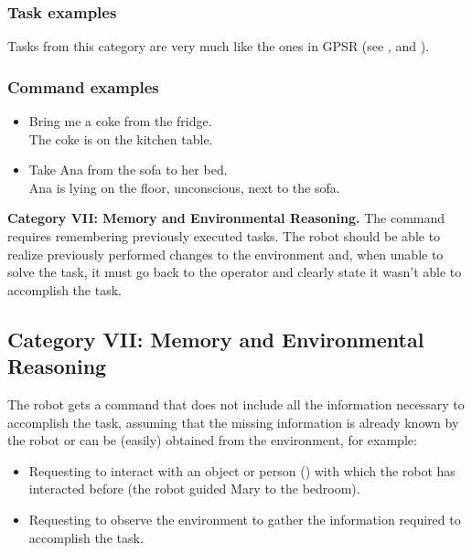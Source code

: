 \subsubsection{Task examples}
Tasks from this category are very much like the ones in GPSR (see ,  and ).

\subsubsection{Command examples}
\begin{itemize}
	\item Bring me a coke from the fridge. \\
	The coke is on the kitchen table. \\

	\item Take Ana from the sofa to her bed. \\
	Ana is lying on the floor, unconscious, next to the sofa. \\
\end{itemize}

		\item \textbf{Category VII: Memory and Environmental Reasoning.} The command requires remembering previously executed tasks. The robot should be able to realize previously performed changes to the environment and, when unable to solve the task, it must go back to the operator and clearly state  it wasn't able to accomplish the task.


%
%
\subsection{Category VII: Memory and Environmental Reasoning}
\label{sec:eegpsr-category7-explained}
The robot gets a command that does not include all the information necessary to accomplish the task, assuming that the missing information is already known by the robot or can be (easily) obtained from the environment, for example:
\begin{itemize}
	\item Requesting to interact with an object or person () with which the robot has interacted before (the robot guided Mary to the bedroom).
	\item Requesting to observe the environment to gather the information required to accomplish the task.
\end{itemize}

